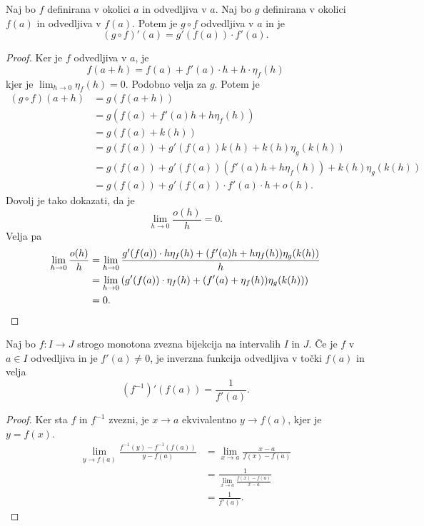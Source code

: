 \documentclass[12pt, a4paper]{article}
\begin{document}
\begin{izrek}
Naj bo $f$ definirana v okolici $a$ in odvedljiva v $a$. Naj bo $g$ definirana v okolici $f(a)$ in odvedljiva v $f(a)$. Potem je $g\circ f$ odvedljiva v $a$ in je
\[
(g\circ f)'(a)=g'(f(a))\cdot f'(a).
\]
\end{izrek}

\begin{proof}
Ker je $f$ odvedljiva v $a$, je
\[
f(a+h)=f(a)+f'(a)\cdot h+h\cdot\eta_f(h)
\]
kjer je $\displaystyle\lim_{h\to 0}\eta_f(h)=0$. Podobno velja za $g$. Potem je
\begin{align*}
(g\circ f)(a+h)&=g(f(a+h))
\\
&=g(f(a)+f'(a)h+h\eta_f(h))
\\
&=g(f(a)+k(h))
\\
&=g(f(a))+g'(f(a))k(h)+k(h)\eta_g(k(h))
\\
&=g(f(a))+g'(f(a))\left(f'(a)h+h\eta_f(h)\right)+k(h)\eta_g(k(h))
\\
&=g(f(a))+g'(f(a))\cdot f'(a)\cdot h+o(h).
\end{align*}
Dovolj je tako dokazati, da je
\[
\lim_{h\to 0}\frac{o(h)}{h}=0.
\]
Velja pa
\begin{align*}
\lim_{h\to 0}\frac{o(h)}{h}&=\lim_{h\to 0}\frac{g'(f(a))\cdot h\eta_f(h)+(f'(a)h+h\eta_f(h))\eta_g(k(h))}{h}
\\
&=\lim_{h\to 0}\left(g'(f(a))\cdot \eta_f(h)+(f'(a)+\eta_f(h))\eta_g(k(h))\right)
\\
&=0.\qedhere
\end{align*}
\end{proof}

\begin{izrek}
Naj bo $f\colon I\to J$ strogo monotona zvezna bijekcija na intervalih $I$ in $J$. Če je $f$ v $a\in I$ odvedljiva in je $f'(a)\ne 0$, je inverzna funkcija odvedljiva v točki $f(a)$ in velja
\[
\left(f^{-1}\right)'(f(a))=\frac{1}{f'(a)}.
\]
\end{izrek}

\begin{proof}
Ker sta $f$ in $f^{-1}$ zvezni, je $x\to a$ ekvivalentno $y\to f(a)$, kjer je $y=f(x)$.
\begin{align*}
\lim_{y\to f(a)}\frac{f^{-1}(y)-f^{-1}(f(a))}{y-f(a)}&=\lim_{x\to a}\frac{x-a}{f(x)-f(a)}
\\
&=\frac{1}{\displaystyle\lim_{x\to a}\frac{f(x)-f(a)}{x-a}}
\\
&=\frac{1}{f'(a)}.
\end{align*}
\end{proof}
\end{document}
